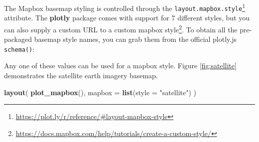 \documentclass[
  12pt,
]{krantz}
\newenvironment{Shaded}{\begin{snugshade}}{\end{snugshade}}
\newcommand{\CommentTok}[1]{\textcolor[rgb]{0.56,0.35,0.01}{\textit{#1}}}
\newcommand{\DataTypeTok}[1]{\textcolor[rgb]{0.13,0.29,0.53}{#1}}
\newcommand{\KeywordTok}[1]{\textcolor[rgb]{0.13,0.29,0.53}{\textbf{#1}}}
\newcommand{\NormalTok}[1]{#1}
\newcommand{\OperatorTok}[1]{\textcolor[rgb]{0.81,0.36,0.00}{\textbf{#1}}}
\newcommand{\StringTok}[1]{\textcolor[rgb]{0.31,0.60,0.02}{#1}}
\renewcommand{\href}[2]{#2\footnote{\url{#1}}}
\begin{document}
The Mapbox basemap styling is controlled through the \href{https://plot.ly/r/reference/\#layout-mapbox-style}{\texttt{layout.mapbox.style}} attribute. The \textbf{plotly} package comes with support for 7 different styles, but you can also supply a custom URL to a \href{https://docs.mapbox.com/help/tutorials/create-a-custom-style/}{custom mapbox style}. To obtain all the pre-packaged basemap style names, you can grab them from the official plotly.js \texttt{schema()}:

\begin{Shaded}
\end{Shaded}

Any one of these values can be used for a mapbox style. Figure \ref{fig:satellite} demonstrates the satellite earth imagery basemap.

\begin{Shaded}
\begin{Highlighting}[]
\KeywordTok{layout}\NormalTok{(}
  \KeywordTok{plot_mapbox}\NormalTok{(), }
  \DataTypeTok{mapbox =} \KeywordTok{list}\NormalTok{(}\DataTypeTok{style =} \StringTok{"satellite"}\NormalTok{)}
\NormalTok{)}
\end{Highlighting}
\end{Shaded}
\end{document}
